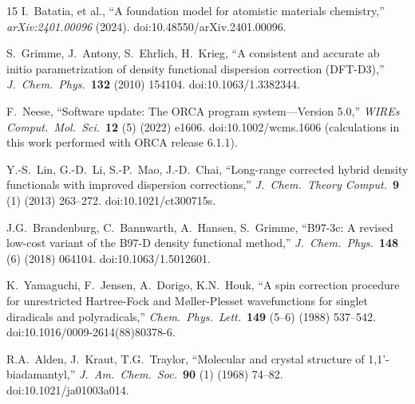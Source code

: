\documentclass[10pt,twocolumn,a4paper]{article}
\begin{document}
\begin{thebibliography}{15}
I.~Batatia, et al., ``A foundation model for atomistic materials chemistry,'' \textit{arXiv:2401.00096} (2024). doi:10.48550/arXiv.2401.00096.

S.~Grimme, J.~Antony, S.~Ehrlich, H.~Krieg, ``A consistent and accurate ab initio parametrization of density functional dispersion correction (DFT-D3),'' \textit{J.\ Chem.\ Phys.}\ \textbf{132} (2010) 154104. doi:10.1063/1.3382344.

F.~Neese, ``Software update: The ORCA program system---Version 5.0,'' \textit{WIREs Comput.\ Mol.\ Sci.}\ \textbf{12} (5) (2022) e1606. doi:10.1002/wcms.1606 (calculations in this work performed with ORCA release 6.1.1).

Y.-S.~Lin, G.-D.~Li, S.-P.~Mao, J.-D.~Chai, ``Long-range corrected hybrid density functionals with improved dispersion corrections,'' \textit{J.\ Chem.\ Theory Comput.}\ \textbf{9} (1) (2013) 263--272. doi:10.1021/ct300715s.

J.G.~Brandenburg, C.~Bannwarth, A.~Hansen, S.~Grimme, ``B97-3c: A revised low-cost variant of the B97-D density functional method,'' \textit{J.\ Chem.\ Phys.}\ \textbf{148} (6) (2018) 064104. doi:10.1063/1.5012601.

K.~Yamaguchi, F.~Jensen, A.~Dorigo, K.N.~Houk, ``A spin correction procedure for unrestricted Hartree-Fock and M\o ller-Plesset wavefunctions for singlet diradicals and polyradicals,'' \textit{Chem.\ Phys.\ Lett.}\ \textbf{149} (5--6) (1988) 537--542. doi:10.1016/0009-2614(88)80378-6.

R.A.~Alden, J.~Kraut, T.G.~Traylor, ``Molecular and crystal structure of 1,1'-biadamantyl,'' \textit{J.\ Am.\ Chem.\ Soc.}\ \textbf{90} (1) (1968) 74--82. doi:10.1021/ja01003a014.

\end{thebibliography}
\end{document}
